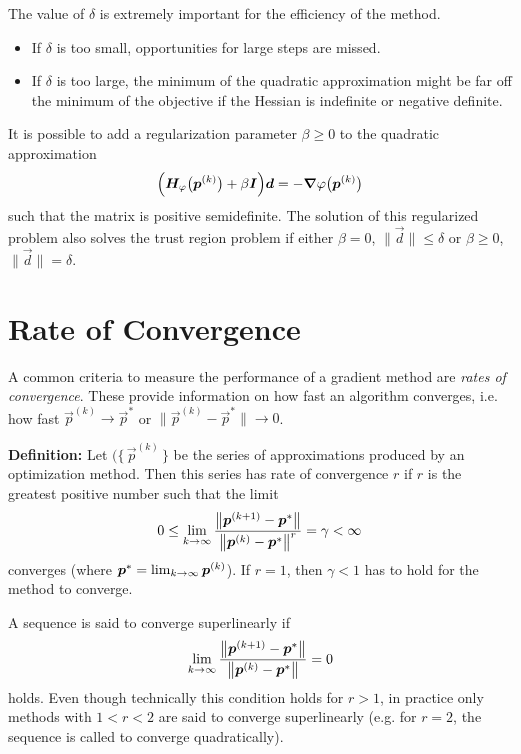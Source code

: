 		The value of \(\delta\) is extremely important for the efficiency of the method.
		\begin{itemize}
			\item If \(\delta\) is too small, opportunities for large steps are missed.
			\item If \(\delta\) is too large, the minimum of the quadratic approximation might be far off the minimum of the objective if the Hessian is indefinite or negative definite.
		\end{itemize}
		It is possible to add a regularization parameter \(\beta \geq 0\) to the quadratic approximation
		\begin{align*}
			\Big( \mat{H}_\varphi\big(\vec{p}^{(k)}\big) + \beta \mat{I} \Big) \vec{d} = -\grad{\varphi}\big(\vec{p}^{(k)}\big)
		\end{align*}
		such that the matrix is positive semidefinite. The solution of this regularized problem also solves the trust region problem if either \( \beta = 0 \), \( \lVert \vec{d} \rVert \leq \delta \) or \( \beta \geq 0 \), \( \lVert \vec{d} \rVert = \delta \).

	\section{Rate of Convergence}
		A common criteria to measure the performance of a gradient method are \emph{rates of convergence}. These provide information on how fast an algorithm converges, i.e. how fast \( \vec{p}^{(k)} \to \vec{p}^\ast \) or \( \big\lVert \vec{p}^{(k)} - \vec{p}^\ast \big\rVert \to 0 \).

		\textbf{Definition:}
		Let \( \big(\{\, \vec{p}^{(k)} \,\big\} \) be the series of approximations produced by an optimization method. Then this series has rate of convergence \(r\) if \(r\) is the greatest positive number such that the limit
		\begin{align*}
			0 \leq \liminfty[k] \frac{\big\lVert \vec{p}^{(k + 1)} - \vec{p}^\ast \big\rVert}{\big\lVert \vec{p}^{(k)} - \vec{p}^\ast \big\rVert^r} = \gamma < \infty
		\end{align*}
		converges (where \( \vec{p}^\ast = \liminfty[k] \vec{p}^{(k)} \)). If \( r = 1 \), then \( \gamma < 1 \) has to hold for the method to converge.

		A sequence is said to converge superlinearly if
		\begin{align*}
			\liminfty[k] \frac{\big\lVert \vec{p}^{(k + 1)} - \vec{p}^\ast \big\rVert}{\big\lVert \vec{p}^{(k)} - \vec{p}^\ast \big\rVert} = 0
		\end{align*}
		holds. Even though technically this condition holds for \( r > 1 \), in practice only methods with \( 1 < r < 2 \) are said to converge superlinearly (e.g. for \(r = 2\), the sequence is called to converge quadratically).

